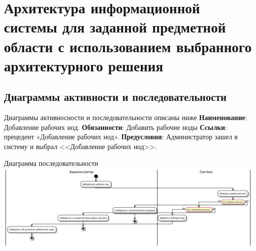 \documentclass[PI,LAB]{HSEUniversity}
\begin{document}
\chapter{Архитектура информационной системы для заданной предметной области с использованием выбранного архитектурного решения}



\section{Диаграммы активности и последовательности}
Диаграммы активносности и последовательности описаны ниже \newline
\textbf{Наименование}: Добавление рабочих нод.\newline
\textbf{Обязанности}: Добавить рабочие ноды\newline
\textbf{Ссылки}:  прецедент «Добавление рабочих нод». \newline
\textbf{Предусловия}: Администратор зашел в систему и выбрал <<Добавление рабочих нод>>.\newline


\begin{FIGURE}[h]{Диаграмма последовательности {\tiny}\label{fig:example-figure}}
	\includegraphics[width=1\textwidth]{out/diag/add_worker_node/add_worker_node}
\end{FIGURE}
\end{document}
